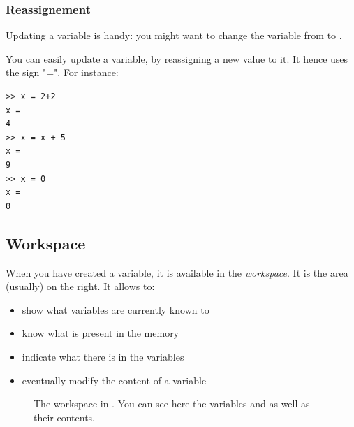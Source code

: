 		\subsubsection{Reassignement}
			Updating a variable is handy: you might want to change the variable  from  to .

			You can easily update a variable, by reassigning a new value to it. It hence uses the sign "=".
			For instance:
\begin{lstlisting}
>> x = 2+2
x = 
4
>> x = x + 5
x =
9
>> x = 0
x =
0
\end{lstlisting}

	\subsection{Workspace}
		When you have created a variable, it is available in the \emph{workspace}.
		It is the area (usually) on the right.
		It allows to:
		\begin{itemize}
			\item show what variables are currently known to \matlab
			\item know what is present in the memory
			\item indicate what there is in the variables
			\item eventually modify the content of a variable
		\end{itemize}
		\begin{figure}
			\center
			\caption{
				The workspace in \matlab. You can see here the variables  and  as well as their contents.
			}
			\label{fig-workspace}
		\end{figure}	

